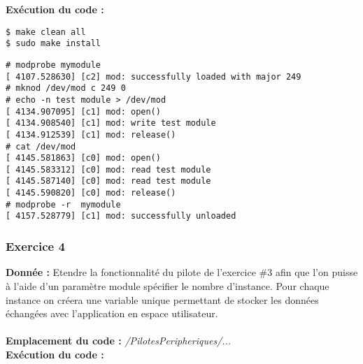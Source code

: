\textbf{Exécution du code : } \\
\begin{lstlisting}
$ make clean all
$ sudo make install
\end{lstlisting}
\begin{lstlisting}
# modprobe mymodule                                                             
[ 4107.528630] [c2] mod: successfully loaded with major 249                     
# mknod /dev/mod c 249 0                                                        
# echo -n test module > /dev/mod                                                
[ 4134.907095] [c1] mod: open()                                                 
[ 4134.908540] [c1] mod: write test module                                      
[ 4134.912539] [c1] mod: release()                                              
# cat /dev/mod                                                                  
[ 4145.581863] [c0] mod: open()                                                 
[ 4145.583312] [c0] mod: read test module                                       
[ 4145.587140] [c0] mod: read test module                                       
[ 4145.590820] [c0] mod: release()                                              
# modprobe -r  mymodule                                                         
[ 4157.528779] [c1] mod: successfully unloaded   
\end{lstlisting}

\subsubsection{Exercice 4}
\textbf{Donnée : } Etendre	la	fonctionnalité	du	pilote	de	l’exercice	\#3 afin	que	l’on	puisse	à	l’aide	d’un	paramètre	
module	spécifier	le	nombre	d’instance.	Pour	chaque	instance	on	créera	une	variable	unique	
permettant	de	stocker	les	données	échangées	avec	l’application	en	espace	utilisateur.\\\\
\textbf{Emplacement du code : } \textit{/PilotesPeripheriques/...}\\

\textbf{Exécution du code : } \\
\begin{lstlisting}

\end{lstlisting}

